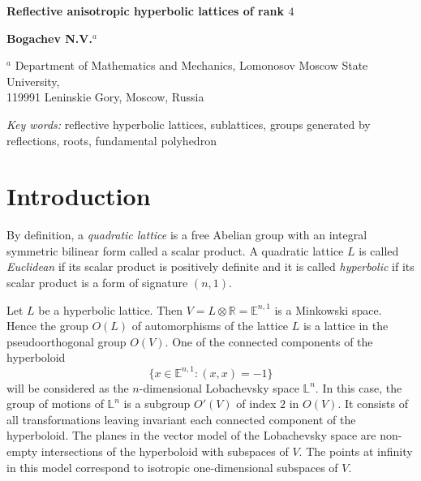 \documentclass[14pt]{article}
\begin{document}
\centerline{{\large{\bf Reflective anisotropic hyperbolic lattices
of rank $4$}}}




\vspace*{0.2cm}

\begin{center}
{\bf Bogachev N.V.$^{a}$}

\small{$^{a}$%
Department of Mathematics and Mechanics,
Lomonosov Moscow State University, \\ 119991 Leninskie Gory, Moscow, Russia%
}
\end{center}


\vspace*{0.2cm}




\begin{abstract}
A hyperbolic lattice is called
\textit{$1.2$-reflective} if   
the subgroup of its automorphism group 
generated by all $1$- and $2$-reflections is of finite index.  
The main result of this article is a complete
classification of $1.2$-reflective maximal anisotropic lattices of rank $4$.
\end{abstract}

\noindent
 {\it Key words:}
reflective hyperbolic lattices, sublattices,  groups generated by reflections,
roots, fundamental polyhedron

\tableofcontents

\section{Introduction}\label{sec}




By definition, a \textit{quadratic lattice} is a free Abelian group with an
integral symmetric bilinear form called a scalar product. A quadratic lattice $L$ is
called \textit{Euclidean}
if its scalar product is positively definite and it is called \textit{hyperbolic}
if its scalar product is a form of signature $(n, 1)$.

Let $L$ be a hyperbolic lattice. Then
$V =  L \otimes \mathbb{R} = \mathbb{E}^{n,1}$ is a Minkowski space. Hence the
group $O(L)$
of automorphisms of the lattice $L$ is a lattice in the pseudoorthogonal
group $O(V)$.
One of the connected components of the hyperboloid
$$
\{ x \in \mathbb{E}^{n,1}\colon (x, x) = -1\}
$$
 will be considered as the $n$-dimensional Lobachevsky space $\mathbb{L}^n$.
In this case, the group of
motions of $\mathbb{L}^n$ is a subgroup $O'(V)$ of index $2$ in $O(V)$.
It consists of all
transformations leaving invariant each connected component of the hyperboloid.
The planes in the vector model of the Lobachevsky space are non-empty
intersections of the hyperboloid with subspaces of $V$. The points at infinity in this
model correspond to isotropic one-dimensional subspaces of $V$.
\end{document}

